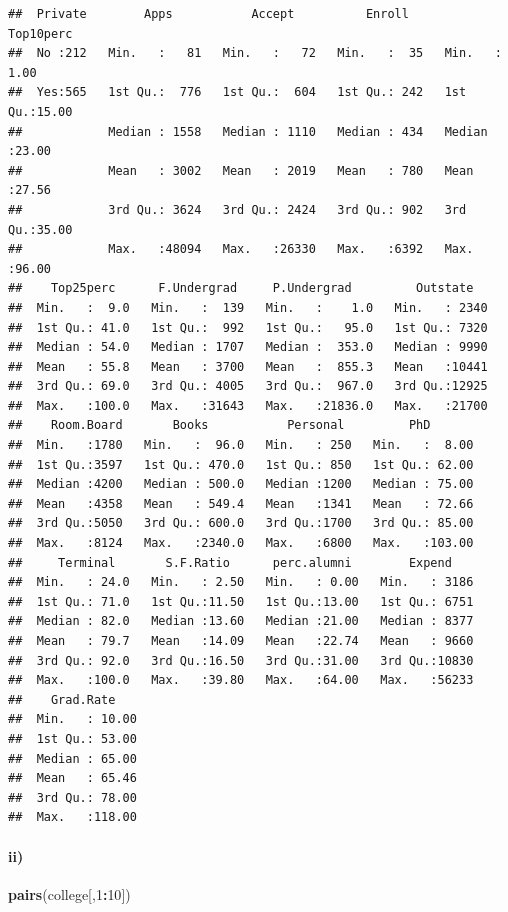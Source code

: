 \documentclass[]{article}
\newenvironment{Shaded}{\begin{snugshade}}{\end{snugshade}}
\newcommand{\KeywordTok}[1]{\textcolor[rgb]{0.13,0.29,0.53}{\textbf{#1}}}
\newcommand{\DecValTok}[1]{\textcolor[rgb]{0.00,0.00,0.81}{#1}}
\newcommand{\OperatorTok}[1]{\textcolor[rgb]{0.81,0.36,0.00}{\textbf{#1}}}
\newcommand{\NormalTok}[1]{#1}
\let\oldparagraph\paragraph
\renewcommand{\paragraph}[1]{\oldparagraph{#1}\mbox{}}
\begin{document}
\begin{verbatim}
##  Private        Apps           Accept          Enroll       Top10perc    
##  No :212   Min.   :   81   Min.   :   72   Min.   :  35   Min.   : 1.00  
##  Yes:565   1st Qu.:  776   1st Qu.:  604   1st Qu.: 242   1st Qu.:15.00  
##            Median : 1558   Median : 1110   Median : 434   Median :23.00  
##            Mean   : 3002   Mean   : 2019   Mean   : 780   Mean   :27.56  
##            3rd Qu.: 3624   3rd Qu.: 2424   3rd Qu.: 902   3rd Qu.:35.00  
##            Max.   :48094   Max.   :26330   Max.   :6392   Max.   :96.00  
##    Top25perc      F.Undergrad     P.Undergrad         Outstate    
##  Min.   :  9.0   Min.   :  139   Min.   :    1.0   Min.   : 2340  
##  1st Qu.: 41.0   1st Qu.:  992   1st Qu.:   95.0   1st Qu.: 7320  
##  Median : 54.0   Median : 1707   Median :  353.0   Median : 9990  
##  Mean   : 55.8   Mean   : 3700   Mean   :  855.3   Mean   :10441  
##  3rd Qu.: 69.0   3rd Qu.: 4005   3rd Qu.:  967.0   3rd Qu.:12925  
##  Max.   :100.0   Max.   :31643   Max.   :21836.0   Max.   :21700  
##    Room.Board       Books           Personal         PhD        
##  Min.   :1780   Min.   :  96.0   Min.   : 250   Min.   :  8.00  
##  1st Qu.:3597   1st Qu.: 470.0   1st Qu.: 850   1st Qu.: 62.00  
##  Median :4200   Median : 500.0   Median :1200   Median : 75.00  
##  Mean   :4358   Mean   : 549.4   Mean   :1341   Mean   : 72.66  
##  3rd Qu.:5050   3rd Qu.: 600.0   3rd Qu.:1700   3rd Qu.: 85.00  
##  Max.   :8124   Max.   :2340.0   Max.   :6800   Max.   :103.00  
##     Terminal       S.F.Ratio      perc.alumni        Expend     
##  Min.   : 24.0   Min.   : 2.50   Min.   : 0.00   Min.   : 3186  
##  1st Qu.: 71.0   1st Qu.:11.50   1st Qu.:13.00   1st Qu.: 6751  
##  Median : 82.0   Median :13.60   Median :21.00   Median : 8377  
##  Mean   : 79.7   Mean   :14.09   Mean   :22.74   Mean   : 9660  
##  3rd Qu.: 92.0   3rd Qu.:16.50   3rd Qu.:31.00   3rd Qu.:10830  
##  Max.   :100.0   Max.   :39.80   Max.   :64.00   Max.   :56233  
##    Grad.Rate     
##  Min.   : 10.00  
##  1st Qu.: 53.00  
##  Median : 65.00  
##  Mean   : 65.46  
##  3rd Qu.: 78.00  
##  Max.   :118.00
\end{verbatim}

\paragraph{ii)}\label{ii}

\begin{Shaded}
\begin{Highlighting}[]
\KeywordTok{pairs}\NormalTok{(college[,}\DecValTok{1}\OperatorTok{:}\DecValTok{10}\NormalTok{])}
\end{Highlighting}
\end{Shaded}
\end{document}
